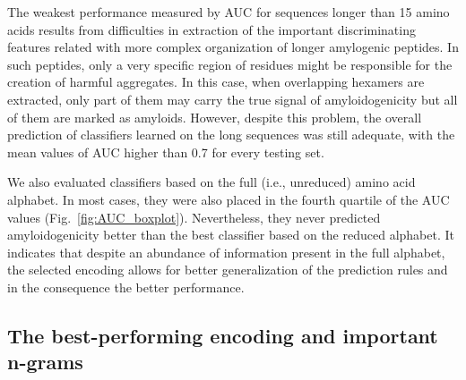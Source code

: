 \documentclass[fleqn,10pt,twoside]{gcb15submission}
\begin{document}
  The weakest performance measured by AUC for sequences longer than 15 amino 
acids results from difficulties in extraction of the important discriminating 
features related with more complex organization of longer amylogenic peptides. 
In such peptides, only a very specific region of residues might be responsible 
for the creation of harmful aggregates. In this case, when overlapping hexamers 
are extracted, only part of them may carry the true signal of amyloidogenicity 
but all of them are marked as amyloids. However, despite this problem, the 
overall prediction of classifiers learned on the long sequences was still 
adequate, with the mean values of AUC higher than 0.7 for every testing set. 


  We also evaluated classifiers based on the full (i.e., unreduced) amino acid 
alphabet. In most cases, they were also placed in the fourth quartile of the AUC 
values (Fig.~\ref{fig:AUC_boxplot}). Nevertheless, they never predicted 
amyloidogenicity better than the best classifier based on the reduced alphabet. 
It indicates that despite an abundance of information present in the full alphabet, the selected
encoding allows for better generalization of the prediction rules and in the 
consequence the better performance.

%
%
%
%
%

\subsection{The best-performing encoding and important n-grams}
\end{document}
